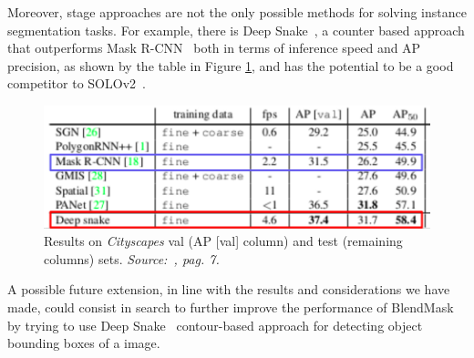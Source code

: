 \documentclass[10pt,twocolumn,letterpaper]{article}
\begin{document}
Moreover, stage approaches are not the only possible methods for solving instance segmentation tasks.
For example, there is Deep Snake~\cite{Authors7_deepsnake}, a counter based approach that outperforms Mask R-CNN~\cite{Authors1_maskrcnn} both in terms of inference speed and AP precision, as shown by the table in Figure \ref{fig:conclusiondeepsnake}, and has the potential to be a good competitor to SOLOv2~\cite{Authors6_SOLOv2}.
\begin{figure}[H]
\centering
  \includegraphics[width=1\linewidth]{./image/conclusion_deepsnake.png}
  \caption{Results on \textit{Cityscapes} val (AP [val] column) and test (remaining columns) sets. \textit{Source:~\cite{Authors7_deepsnake}, pag. 7.}}
  \label{fig:conclusiondeepsnake}
\noindent
\end{figure}
A possible future extension, in line with the results and considerations we have made, could consist in search to further improve the performance of BlendMask~\cite{Authors2_BlendMask} by trying to use Deep Snake~\cite{Authors7_deepsnake} contour-based approach for detecting object bounding boxes of a image.
\end{document}
